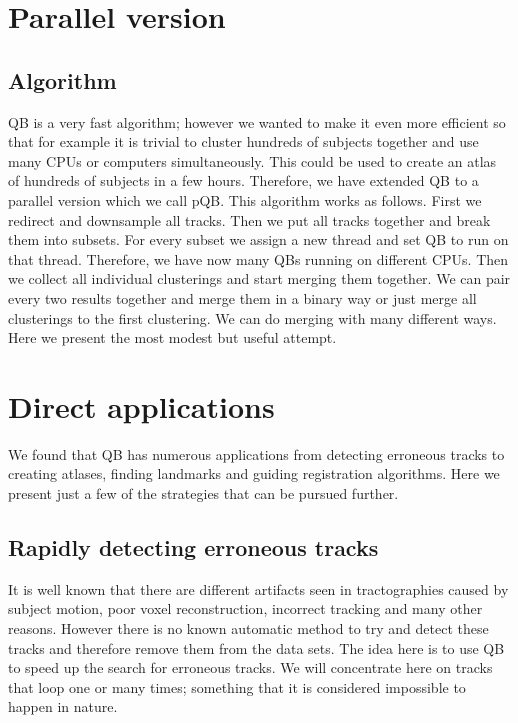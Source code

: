 \documentclass[preprint,authoryear,a4paper,10pt,onecolumn]{elsarticle}
\begin{document}
\section{Parallel version\label{sub:Parallel-version}}


\subsection{Algorithm}

QB is a very fast algorithm; however we wanted to make it even more
efficient so that for example it is trivial to cluster hundreds of
subjects together and use many CPUs or computers simultaneously. This
could be used to create an atlas of hundreds of subjects in a few
hours. Therefore, we have extended QB to a parallel version which we
call pQB. This algorithm works as follows. First we redirect and
downsample all tracks. Then we put all tracks together and break them
into subsets. For every subset we assign a new thread and set QB to run
on that thread. Therefore, we have now many QBs running on different
CPUs. Then we collect all individual clusterings and start merging them
together. We can pair every two results together and merge them in a
binary way or just merge all clusterings to the first clustering.  We
can do merging with many different ways. Here we present the most modest
but useful attempt.

\section{Direct applications}

We found that QB has numerous applications from detecting erroneous
tracks to creating atlases, finding landmarks and guiding registration
algorithms. Here we present just a few of the strategies that can be
pursued further.


\subsection{Rapidly detecting erroneous tracks}

It is well known that there are different artifacts seen in
tractographies caused by subject motion, poor voxel reconstruction,
incorrect tracking and many other reasons. However there is no known
automatic method to try and detect these tracks and therefore remove
them from the data sets. The idea here is to use QB to speed up the
search for erroneous tracks. We will concentrate here on tracks that
loop one or many times; something that it is considered impossible to
happen in nature.
\end{document}
